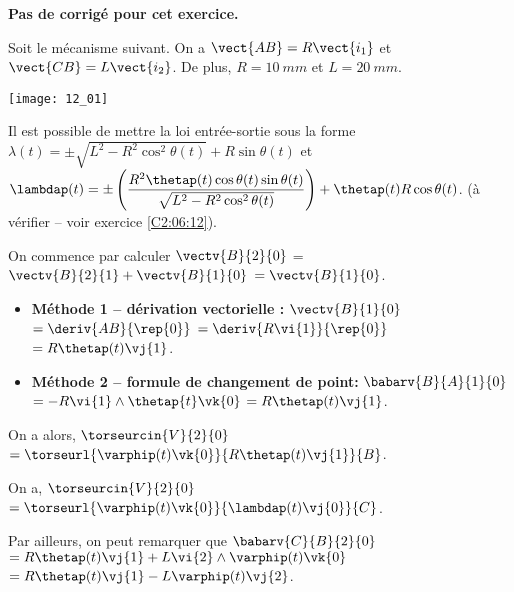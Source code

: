 \normaltrue \difficilefalse \tdifficilefalse
\correctionfalse


\setcounter{question}{0}
\ifcorrection
\else
\textbf{Pas de corrigé pour cet exercice.}
\fi

\ifprof
\else
Soit le mécanisme suivant. On a $\vect{AB}=R\vect{i_1}$ et $\vect{CB}=L\vect{i_2}$. De plus, 
$R=\SI{10}{mm}$ et $L=\SI{20}{mm}$. 

\begin{center}
\texttt{[image: 12\_01]}
\end{center}
\fi

Il est possible de mettre la loi entrée-sortie sous la forme  
$\lambda(t) = \pm\sqrt{L^2 - R^2\cos^2\theta(t)} + R\sin\theta(t) $ 
et 
$\lambdap(t) = \pm\left( \dfrac{R^2 \thetap(t) \cos\theta(t)\sin\theta(t)}{\sqrt{L^2 - R^2\cos^2\theta(t)}}\right) + \thetap(t)R\cos\theta(t)$.
 (à vérifier -- voir exercice \ref{C2:06:12}).

\ifprof
On commence par calculer $\vectv{B}{2}{0}$ = $\vectv{B}{2}{1}+\vectv{B}{1}{0}$ $=\vectv{B}{1}{0}$.
\begin{itemize}
\item \textbf{Méthode 1 -- dérivation vectorielle :}  $\vectv{B}{1}{0}$ $=\deriv{AB}{\rep{0}}$ 
$=\deriv{R\vi{1}}{\rep{0}}$ 
$= R\thetap(t) \vj{1}$. 
\item \textbf{Méthode 2 -- formule de changement de point: }
$\babarv{B}{A}{1}{0}$ 
$= -R\vi{1}\wedge \thetap{t} \vk{0}$
$= R\thetap(t) \vj{1}$.
\end{itemize}

On a alors, 
$\torseurcin{V}{2}{0}$
$=\torseurl{\varphip(t)\vk{0}}{R\thetap(t) \vj{1}}{B}$.

\else
\fi


\ifprof
On a, 
$\torseurcin{V}{2}{0}$
$=\torseurl{\varphip(t)\vk{0}}{\lambdap(t) \vj{0}}{C}$.

Par ailleurs, on peut remarquer que 
$\babarv{C}{B}{2}{0}$
$= R\thetap(t) \vj{1} + L\vi{2}\wedge\varphip(t) \vk{0}$ 
$= R\thetap(t) \vj{1} - L\varphip(t)\vj{2}$.


